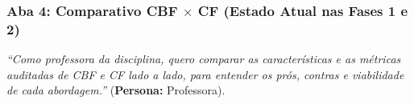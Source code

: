 \subsubsection{Aba 4: Comparativo CBF $\times$ CF (Estado Atual nas Fases 1 e 2)}

\begin{tcolorbox}[userstorybox, title={User Story Vinculada (Aba 4)}]
\textit{``Como professora da disciplina, quero comparar as características e as métricas auditadas de CBF e CF lado a lado, para entender os prós, contras e viabilidade de cada abordagem.''} (\textbf{Persona:} Professora).
\end{tcolorbox}

